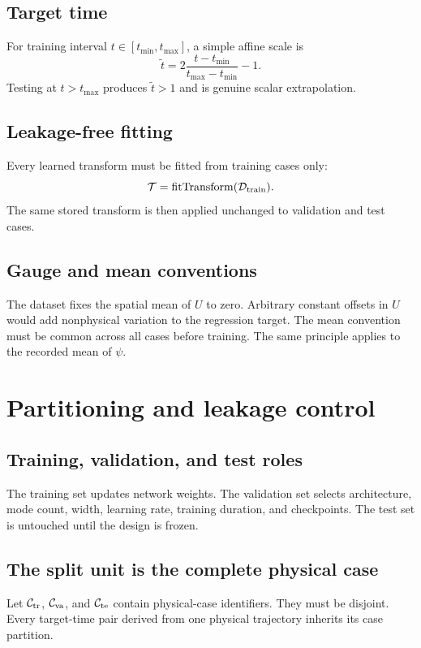 \documentclass[11pt]{article}
\begin{document}
\subsection{Target time}
For training interval $t\in[t_{\min},t_{\max}]$, a simple affine scale is
\[
\widetilde t=2\frac{t-t_{\min}}{t_{\max}-t_{\min}}-1.
\]
Testing at $t>t_{\max}$ produces $\widetilde t>1$ and is genuine scalar extrapolation.

\subsection{Leakage-free fitting}
Every learned transform must be fitted from training cases only:
\[
\mathcal{T}=\operatorname{fitTransform}(\mathcal{D}_{\rm train}).
\]
The same stored transform is then applied unchanged to validation and test cases.

\subsection{Gauge and mean conventions}
The dataset fixes the spatial mean of $U$ to zero. Arbitrary constant offsets in $U$ would add nonphysical variation to the regression target. The mean convention must be common across all cases before training. The same principle applies to the recorded mean of $\psi$.

\section{Partitioning and leakage control}
\label{sec:splits}

\subsection{Training, validation, and test roles}
The training set updates network weights. The validation set selects architecture, mode count, width, learning rate, training duration, and checkpoints. The test set is untouched until the design is frozen.

\subsection{The split unit is the complete physical case}
Let $\mathcal{C}_{\rm tr}$, $\mathcal{C}_{\rm va}$, and $\mathcal{C}_{\rm te}$ contain physical-case identifiers. They must be disjoint. Every target-time pair derived from one physical trajectory inherits its case partition.
\end{document}
